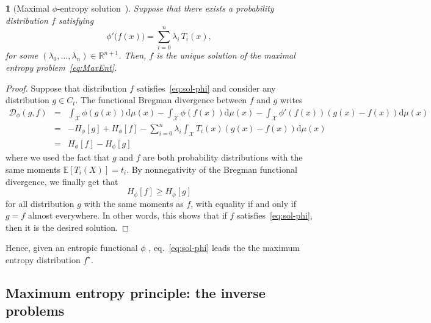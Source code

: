 \documentclass[english,sort&compress]{elsarticle}
\theoremstyle{definition}
\theoremstyle{plain}
\newtheorem{prop}{\protect\propositionname}
\theoremstyle{plain}
\providecommand{\propositionname}{Proposition}
\def\dmu{\mathrm{d}\mu}
\def\fD{\mathcal{D}}
\def\Rset{\mathbb{R}}
\def\X{\mathcal{X}}
\newcommand{\Esp}[1]{\mathbb{E}\left[ #1 \right]}
\begin{document}
\begin{prop}[Maximal           $\phi$-entropy           solution~\cite{KesKap89,
    KesKap90}]\label{prop:sol-phi}
  Suppose that there exists a probability distribution $f$ satisfying
  \begin{equation}\label{eq:sol-phi}
    \phi'\big(f(x)\big) = \sum_{i=0}^n \lambda_i \, T_i(x),
  \end{equation}
  for  some $(\lambda_0,\ldots,\lambda_n)  \in \Rset^{n+1}$.   Then, $f$  is the
  unique solution of the maximal entropy problem~\eqref{eq:MaxEnt}.
\end{prop}
%
\begin{proof}  Suppose that  distribution  $f$ satisfies~\eqref{eq:sol-phi}  and
  consider  any distribution  $g  \in C_t$.  The  functional Bregman  divergence
  between $f$ and $g$ writes
  \begin{eqnarray*}
  \fD_\phi(g,f) & = & \int_\X \phi(g(x)) \dmu(x) - \int_\X \phi(f(x)) \dmu(x) -
  \int_\X \phi'(f(x)) \left( g(x) - f(x) \right) \dmu(x)
  \\[2mm]
  & = & - H_\phi[g] + H_\phi[f] - \sum_{i=0}^n \lambda_i \int_\X T_i(x) 
\left( g(x) - f(x)  \right) \dmu(x) \\[2mm]
  & = & H_\phi[f] - H_\phi[g]
  \end{eqnarray*}
  where we  used the fact  that $g$ and  $f$ are both  probability distributions
  with the same  moments $\Esp{T_i(X)} = t_i$.  By  nonnegativity of the Bregman
  functional divergence, we finally get that
  \[
  H_\phi[f] \ge H_\phi[g]
  \]
  for all distribution $g$ with the  same moments as $f$, with equality if and
  only if  $g = f$ almost  everywhere.  In other  words, this shows that  if $f$
  satisfies~\eqref{eq:sol-phi}, then it is the desired solution.
\end{proof}

Hence, given  an entropic functional $\phi$ ,
eq.~\eqref{eq:sol-phi}    leads   the    the   maximum    entropy   distribution
$f^\star$.  



\subsection{Maximum entropy principle: the inverse problems}
\end{document}
